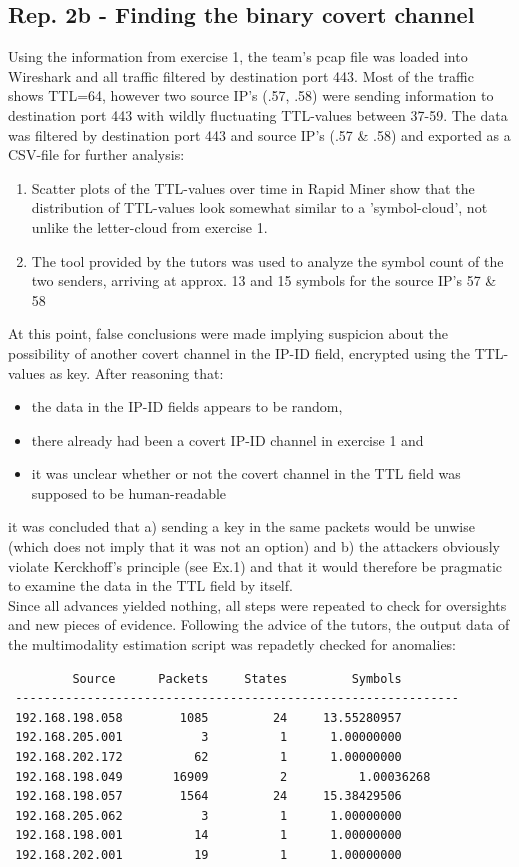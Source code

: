 \documentclass{article}
\begin{document}
\subsection*{Rep. 2b - Finding the binary covert channel}
Using the information from exercise 1, the team's pcap file was loaded into Wireshark and all traffic filtered by destination port 443. Most of the traffic shows TTL=64, however two source IP's (.57, .58) were sending information to destination port 443 with wildly fluctuating TTL-values between 37-59. The data was filtered by destination port 443 and source IP's (.57 \& .58) and exported as a CSV-file for further analysis:
\begin{enumerate}
\item Scatter plots of the TTL-values over time in Rapid Miner show that the distribution of TTL-values look somewhat similar to a 'symbol-cloud', not unlike the letter-cloud from exercise 1.
\item The tool provided by the tutors was used to analyze the symbol count of the two senders, arriving at approx. 13 and 15 symbols for the source IP's 57 \& 58
\end{enumerate}

At this point, false conclusions were made implying suspicion about the possibility of another covert channel in the IP-ID field, encrypted using the TTL-values as key. After reasoning that:
\begin{itemize}
\item the data in the IP-ID fields appears to be random,
\item there already had been a covert IP-ID channel in exercise 1 and
\item it was unclear whether or not the covert channel in the TTL field was supposed to be human-readable
\end{itemize}
it was concluded that a) sending a key in the same packets would be unwise (which does not imply that it was not an option) and b) the attackers obviously violate Kerckhoff's principle (see Ex.1) and that it would therefore be pragmatic to examine the data in the TTL field by itself.\\

Since all advances yielded nothing, all steps were repeated to check for oversights and new pieces of evidence. Following the advice of the tutors, the output data of the multimodality estimation script was repadetly checked for anomalies:

\begin{verbatim}
         Source		 Packets	 States	        Symbols
 -------------------------------------------------------------- 
 192.168.198.058	    1085	     24	    13.55280957
 192.168.205.001	       3	      1	     1.00000000
 192.168.202.172	      62	      1	     1.00000000
 192.168.198.049	   16909	      2	    	 1.00036268
 192.168.198.057	    1564	     24	    15.38429506
 192.168.205.062	       3	      1	     1.00000000
 192.168.198.001	      14	      1	     1.00000000
 192.168.202.001	      19	      1	     1.00000000
\end{verbatim}
\end{document}
